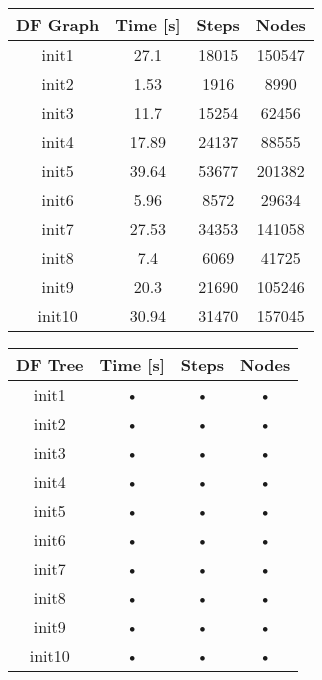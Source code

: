 \documentclass[a4paper,10pt]{article}
\begin{document}
	\begin{tabular}{|c||c|c|c|}
		\hline 
		\textbf{DF Graph} & \textbf{Time [s]} & \textbf{Steps} & \textbf{Nodes} \\ 
		\hline 
		init1 & 27.1 & 18015 & 150547 \\ 
		\hline 
		init2 & 1.53 & 1916 & 8990 \\ 
		\hline 
		init3 & 11.7 & 15254 & 62456 \\ 
		\hline 
		init4 & 17.89 & 24137 & 88555 \\ 
		\hline 
		init5 & 39.64 & 53677 & 201382 \\ 
		\hline 
		init6 & 5.96 & 8572 & 29634 \\ 
		\hline 
		init7 & 27.53 & 34353 & 141058 \\ 
		\hline 
		init8 & 7.4 & 6069 & 41725 \\ 
		\hline 
		init9 & 20.3 & 21690 & 105246 \\ 
		\hline 
		init10 & 30.94 & 31470 & 157045 \\ 
		\hline 
	\end{tabular} 
	\hspace{0.5cm}
	\begin{tabular}{|c||c|c|c|}
		\hline 
		\textbf{DF Tree} & \textbf{Time [s]} & \textbf{Steps} & \textbf{Nodes} \\ 
		\hline 
		init1 & • & • & • \\ 
		\hline 
		init2 & • & • & • \\ 
		\hline 
		init3 & • & • & • \\ 
		\hline 
		init4 & • & • & • \\ 
		\hline 
		init5 & • & • & • \\ 
		\hline 
		init6 & • & • & • \\ 
		\hline 
		init7 & • & • & • \\ 
		\hline 
		init8 & • & • & • \\ 
		\hline 
		init9 & • & • & • \\ 
		\hline 
		init10 & • & • & • \\ 
		\hline 
	\end{tabular}	
	
\end{document}
